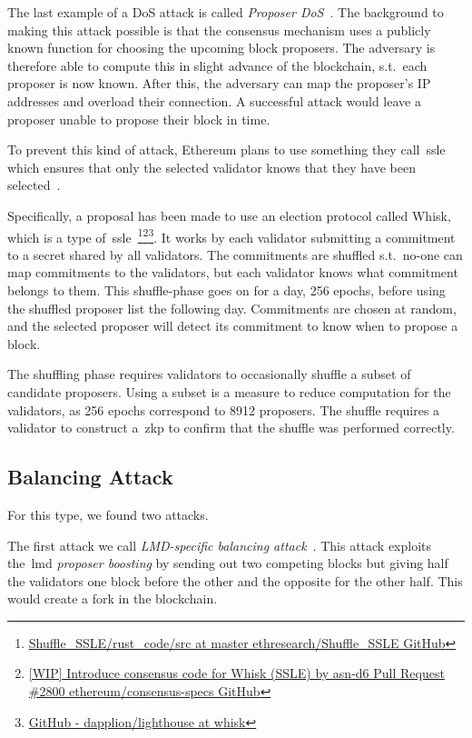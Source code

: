 The last example of a DoS attack is called \textit{Proposer DoS}~\cite{EthereumSSLE2024,EthereumAttackDefense2024}.
The background to making this attack possible is
that the consensus mechanism uses a publicly known function for choosing the upcoming block proposers.
The adversary is therefore able to compute this in slight advance of the blockchain, s.t.\ each proposer is now known.
After this, the adversary can map the proposer's IP addresses and overload their connection.
A successful attack would leave a proposer unable to propose their block in time.

To prevent this kind of attack,
Ethereum plans
to use something they call~\gls{ssle} which ensures
that only the selected validator knows that they have been selected~\cite{EthereumSSLE2024,EthereumResearchSSLE2024}.

Specifically, a proposal has been made to use an election protocol called Whisk, which is a type of~\gls{ssle}~\cite{Whisk2024}\footnote{\href{https://github.com/ethresearch/Shuffle_SSLE/tree/master/rust_code/src}{Shuffle\_SSLE/rust\_code/src at master ethresearch/Shuffle\_SSLE GitHub}}\footnote{\href{https://github.com/ethereum/consensus-specs/pull/2800}{[WIP] Introduce consensus code for Whisk (SSLE) by asn-d6 Pull Request \#2800 ethereum/consensus-specs GitHub}}\footnote{\href{https://github.com/dapplion/lighthouse/tree/whisk}{GitHub - dapplion/lighthouse at whisk}}.
It works by each validator submitting a commitment to a secret shared by all validators.
The commitments are shuffled s.t.\ no-one can map commitments to the validators,
but each validator knows what commitment belongs to them.
This shuffle-phase goes on for a day, 256 epochs, before using the shuffled proposer list the following day.
Commitments are chosen at random, and the selected proposer will detect its commitment to know when to propose a block.

The shuffling phase requires validators to occasionally shuffle a subset of candidate proposers.
Using a subset is a measure to reduce computation for the validators, as 256 epochs correspond to 8912 proposers.
The shuffle requires a validator to construct a~\gls{zkp} to confirm that the shuffle was performed correctly.

\subsection{Balancing Attack}\label{subsec:balancing-attack}
For this type, we found two attacks.

The first attack we call \textit{LMD-specific balancing attack}~\cite{10.1145/3560829.3563560}.
This attack exploits the~\gls{lmd} \textit{proposer
boosting} by sending out two competing blocks
but giving half the validators one block before the other and the opposite for the other half.
This would create a fork in the blockchain.

